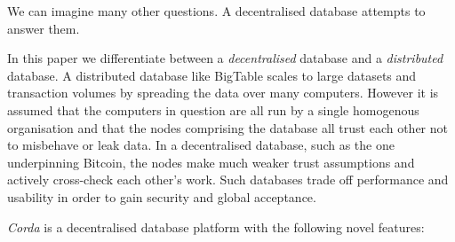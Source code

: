 \documentclass{article}
\begin{document}
We can imagine many other questions. A decentralised database attempts to answer them.

In this paper we differentiate between a \emph{decentralised} database and a \emph{distributed} database. A distributed
database like BigTable\cite{BigTable} scales to large datasets and transaction volumes by spreading the data over many
computers. However it is assumed that the computers in question are all run by a single homogenous organisation and that
the nodes comprising the database all trust each other not to misbehave or leak data. In a decentralised database, such
as the one underpinning Bitcoin\cite{Bitcoin}, the nodes make much weaker trust assumptions and actively cross-check
each other's work. Such databases trade off performance and usability in order to gain security and global acceptance.

\emph{Corda} is a decentralised database platform with the following novel features:
\end{document}
